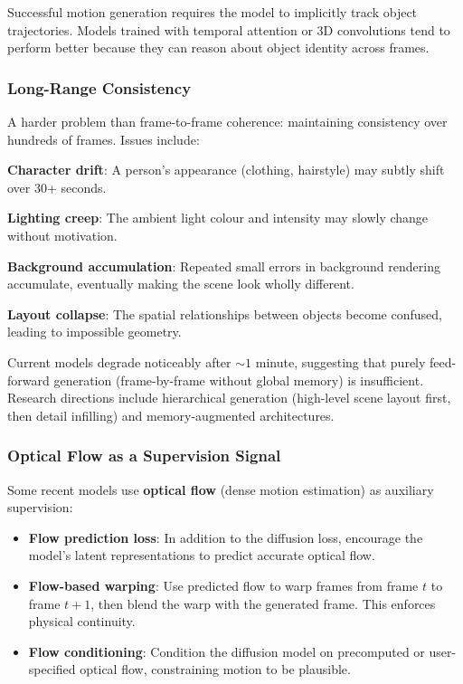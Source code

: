 Successful motion generation requires the model to implicitly track object trajectories. Models trained with temporal attention or 3D convolutions tend to perform better because they can reason about object identity across frames.

\subsubsection{Long-Range Consistency}

A harder problem than frame-to-frame coherence: maintaining consistency over hundreds of frames. Issues include:
\begin{warnbox}
\textbf{Character drift}: A person's appearance (clothing, hairstyle) may subtly shift over 30+ seconds.

\textbf{Lighting creep}: The ambient light colour and intensity may slowly change without motivation.

\textbf{Background accumulation}: Repeated small errors in background rendering accumulate, eventually making the scene look wholly different.

\textbf{Layout collapse}: The spatial relationships between objects become confused, leading to impossible geometry.
\end{warnbox}

Current models degrade noticeably after $\sim 1$ minute, suggesting that purely feed-forward generation (frame-by-frame without global memory) is insufficient. Research directions include hierarchical generation (high-level scene layout first, then detail infilling) and memory-augmented architectures.

\subsubsection{Optical Flow as a Supervision Signal}

Some recent models use \textbf{optical flow} (dense motion estimation) as auxiliary supervision:
\begin{itemize}
  \item \textbf{Flow prediction loss}: In addition to the diffusion loss, encourage the model's latent representations to predict accurate optical flow.
  \item \textbf{Flow-based warping}: Use predicted flow to warp frames from frame $t$ to frame $t+1$, then blend the warp with the generated frame. This enforces physical continuity.
  \item \textbf{Flow conditioning}: Condition the diffusion model on precomputed or user-specified optical flow, constraining motion to be plausible.
\end{itemize}

